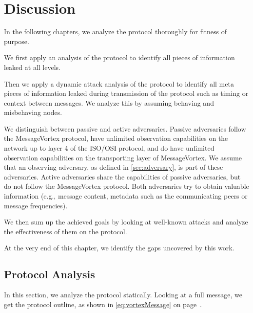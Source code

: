 
\part{Discussion \label{sec:discussion}}

In the following chapters, we analyze the protocol thoroughly for fitness of purpose. 

We first apply an analysis of the protocol to identify all pieces of information leaked at all levels.

Then we apply a dynamic attack analysis of the protocol to identify all meta pieces of information leaked during transmission of the protocol such as timing or context between messages. We analyze this by assuming behaving and misbehaving nodes.

We distinguish between passive and active adversaries. Passive adversaries follow the MessageVortex protocol, have unlimited observation capabilities on the network up to layer 4 of the ISO/OSI protocol, and do have unlimited observation capabilities on the transporting layer of MessageVortex. We assume that an observing adversary, as defined in \ref{sec:adversary}, is part of these adversaries. Active adversaries share the capabilities of passive adversaries, but do not follow the MessageVortex protocol. Both adversaries try to obtain valuable information (e.g., message content, metadata such as the communicating peers or message frequencies). 

We then sum up the achieved goals by looking at well-known attacks and analyze the effectiveness of them on the protocol.

At the very end of this chapter, we identify the gaps uncovered by this work.

\chapter{Protocol Analysis}
In this section, we analyze the protocol statically. Looking at a full message, we get the protocol outline, as shown in \eqref{eq:vortexMessage} on page~\pageref{eq:vortexMessage}.

